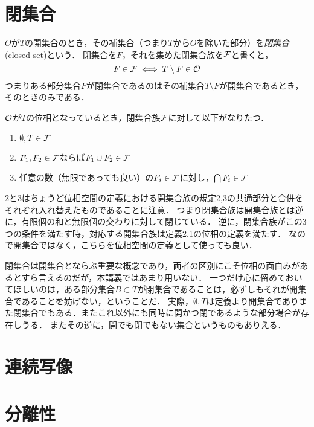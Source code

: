 \documentclass[11pt,a4paper]{jsarticle}
\begin{document}

\section{閉集合}
$O$が$T$の開集合のとき，その補集合（つまり$T$から$O$を除いた部分）を\emph{閉集合}(closed set)という．
閉集合を$F$，それを集めた閉集合族を$\mathcal{F}$と書くと，
\[
 F \in \mathcal{F} \iff T \setminus F \in \mathcal{O}
\]
つまりある部分集合$F$が閉集合であるのはその補集合$T \setminus F$が開集合であるとき，そのときのみである．

$\mathcal{O}$が$T$の位相となっているとき，閉集合族$\mathcal{F}$に対して以下がなりたつ．
\begin{enumerate}
 \item $\emptyset, T \in \mathcal{F}$
 \item $F_1, F_2 \in \mathcal{F}$ならば$F_1 \cup F_2 \in \mathcal{F}$
 \item 任意の数（無限であっても良い）の$F_i \in \mathcal{F}$に対し，$\bigcap F_i \in \mathcal{F}$
\end{enumerate}
2と3はちょうど位相空間の定義における開集合族の規定2,3の共通部分と合併をそれぞれ入れ替えたものであることに注意．
つまり閉集合族は開集合族とは逆に，有限個の和と無限個の交わりに対して閉じている．
逆に，閉集合族がこの3つの条件を満たす時，対応する開集合族は定義2.1の位相の定義を満たす．
なので開集合ではなく，こちらを位相空間の定義として使っても良い．

閉集合は開集合とならぶ重要な概念であり，両者の区別にこそ位相の面白みがあるとすら言えるのだが，本講義ではあまり用いない．
一つだけ心に留めておいてほしいのは，ある部分集合$B \subset T$が閉集合であることは，必ずしもそれが開集合であることを妨げない，ということだ．
実際，$\emptyset, T$は定義より開集合でありまた閉集合でもある．またこれ以外にも同時に開かつ閉であるような部分場合が存在しうる．
またその逆に，開でも閉でもない集合というものもありえる．








\section{連続写像}


\section{分離性}
\end{document}
